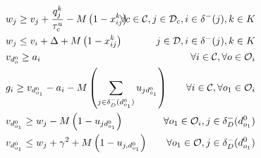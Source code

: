 \documentclass{article}
\begin{document}
\begin{alignat}{3}
    \label{mod:c6}         & w_{j} \geq v_{j}  + {  \frac{q^k_j}{\tau^u_c} -M\left(1- x^{k}_{ij}\right) }                                                                                                                                                                                                           & \hspace{-20mm}  \forall c \in  \mathcal{C}, j \in \mathcal{D}_{c}, i \in \delta^{-}(j),  k \in K \\
    \label{mod:c7}         & w_{j} \leq v_{i}  + \Delta + M\left(1- x^{k}_{ij}\right)                                                                                                                                                                                                                               & \hspace{-20mm}   j \in \mathcal{D},  i \in \delta^{-}(j),  k \in K                               \\
    \label{mod:c8}         & v_{d^0_{o}} \geq a_i                                                                                                                                                                                                                                                                   & \hspace{-20mm} \forall  i \in \mathcal{C}, \forall o \in \mathcal{O}_i                           \\
    \label{mod:c9}         & g_{i} \geq v_{d^0_{o_1}} - a_i - M\left(  \sum_{ j \in \delta^{-}_{D}(d^0_{o_1})  }{u_{jd^0_{o_1}}}\right)                                                                                                                                                                             & \hspace{-20mm}  \forall  i \in \mathcal{C}, \forall o_1 \in \mathcal{O}_i                        \\
    \label{mod:c101}       & v_{d^0_{o_1}} \geq w_j - M\left(1- u_{jd^0_{o_1}}\right)                                                                                                                                                                                                                               & \hspace{-40mm}    \forall o_1 \in \mathcal{O}_i,  j \in \delta_{D}^{-}(d^0_{o_1})                \\
    \label{mod:c10}        & v_{d^0_{o_1}}  \leq  w_j + \gamma^2 + M\left(1- u_{j,d^0_{o_1}}\right)                                                                                                                                                                                                                 & \hspace{-20mm}  \forall  o_1 \in \mathcal{O},  j \in \delta_{D}^{-}(d^0_{o_1})                   \\

\end{alignat}
\end{document}
